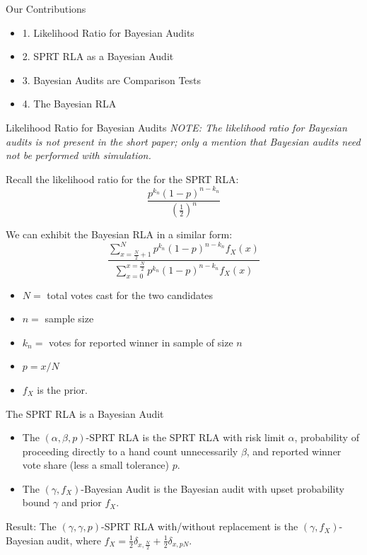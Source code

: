 \documentclass{beamer}
\begin{document}
\begin{frame}{Our Contributions}
\begin{itemize}
    \item 1. Likelihood Ratio for Bayesian Audits
    \vskip 1cm
    \item 2. SPRT RLA as a Bayesian Audit
    \vskip 1cm
    \item 3. Bayesian Audits are Comparison Tests
    \vskip 1cm
    \item 4. The Bayesian RLA
\end{itemize}
\end{frame}

\begin{frame}{Likelihood Ratio for Bayesian Audits}
\emph{NOTE: The likelihood ratio for Bayesian audits is not present in the short paper; only a mention that Bayesian audits need not be performed with simulation.}

Recall the likelihood ratio for the for the SPRT RLA:
    $$\frac{p^{k_n} (1-p)^{n-k_n}}{(\frac{1}{2})^n}$$

We can exhibit the Bayesian RLA in a similar form:
    $$\frac{\sum_{x=\frac{N}{2}+1}^N p^{k_n} (1-p)^{n-k_n} f_X(x)}{\sum_{x=0}^{x=\frac{N}{2}} p^{k_n} (1-p)^{n-k_n} f_X(x)}$$

\begin{itemize}
    \item $N =$ total votes cast for the two candidates
    \item $n =$ sample size
    \item $k_n =$ votes for reported winner in sample of size $n$
    \item $p = x/N$
    \item $f_X$ is the prior.
\end{itemize}
\end{frame}

\begin{frame}{The SPRT RLA is a Bayesian Audit}
\begin{itemize}
    \item The $(\alpha, \beta, p)$-SPRT RLA is the SPRT RLA with risk limit $\alpha$, probability of proceeding directly to a hand count unnecessarily $\beta$, and reported winner vote share (less a small tolerance) $p$.
    \item The $(\gamma, f_X)$-Bayesian Audit is the Bayesian audit with upset probability bound $\gamma$ and prior $f_X$.
\end{itemize}
\vskip 1cm
Result: The $(\gamma, \gamma, p)$-SPRT RLA with/without replacement is the $(\gamma, f_X)$-Bayesian audit, where $f_X = \frac{1}{2} \delta_{x,\frac{N}{2}} + \frac{1}{2} \delta_{x,pN}$.
\end{frame}
\end{document}
